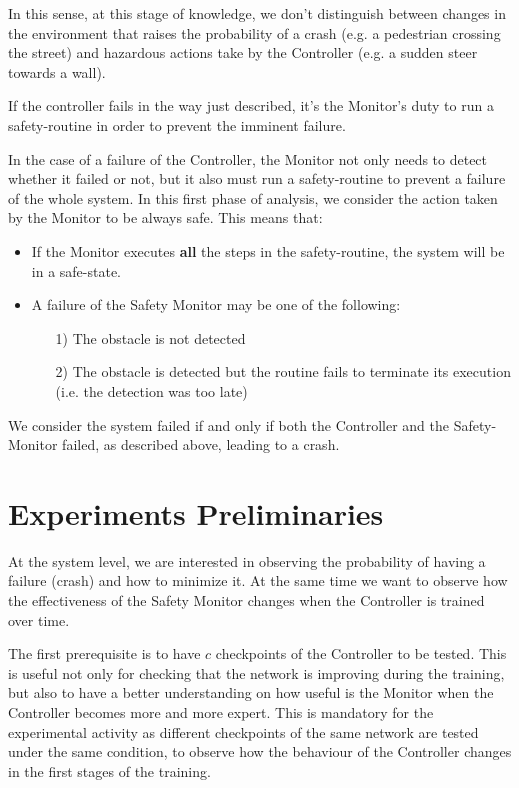 In this sense, at this stage of knowledge, we don't distinguish between changes in the environment that raises the probability of a crash (e.g. a pedestrian crossing the street) and hazardous actions take by the Controller (e.g. a sudden steer towards a wall).

If the controller fails in the way just described, it's the Monitor's duty to run a safety-routine in order to prevent the imminent failure.\newline

In the case of a failure of the Controller, the Monitor not only needs to detect whether it failed or not, but it also must run a safety-routine to prevent a failure of the whole system. In this first phase of analysis, we consider the action taken by the Monitor to be always safe. This means that:

\begin{itemize}
	\item If the Monitor executes \textbf{all} the steps in the safety-routine, the system will be in a safe-state.
	\item A failure of the Safety Monitor may be one of the following:
	\begin{itemize}
		\item[1)] The obstacle is not detected
		\item[2)] The obstacle is detected but the routine fails to terminate its execution (i.e. the detection was too late)
	\end{itemize}
\end{itemize}

We consider the system failed if and only if both the Controller and the Safety-Monitor failed, as described above, leading to a crash.


\section{Experiments Preliminaries}

At the system level, we are interested in observing the probability of having a failure (crash) and how to minimize it. At the same time we want to observe how the effectiveness of the Safety Monitor changes when the Controller is trained over time.

The first prerequisite is to have $c$ checkpoints of the Controller to be tested. This is useful not only for checking that the network is improving during the training, but also to have a better understanding on how useful is the Monitor when the Controller becomes more and more expert. This is mandatory for the experimental activity as different checkpoints of the same network are tested under the same condition, to observe how the behaviour of the Controller changes in the first stages of the training.

